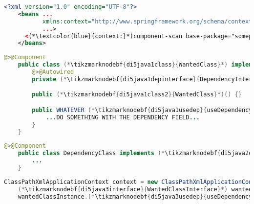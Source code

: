 \example
\begin{lstlisting}[language=XML, title={Configuration XML}]
    <?xml version="1.0" encoding="UTF-8"?>
    <beans ...
           xmlns:context="http://www.springframework.org/schema/context"
           ...>
      <(*\textcolor{blue}{context:}*)component-scan base-package="somepackage.subpackage"/>
    </beans>
\end{lstlisting}
\begin{lstlisting}[language=Java, title={Wanted class with the zero--parameter constructor}]
    @>@Component
    public class (*\tikzmarknodebf{di5java1class}{WantedClass}*) implements (*\tikzmarknodebf{di5java1interface}{WantedClassInterface}*) {
        @>@Autowired
        private (*\tikzmarknodebf{di5java1depinterface}{DependencyInterface}*) dependencyField;

        public (*\tikzmarknodebf{di5java1class2}{WantedClass}*)() {}

        public WHATEVER (*\tikzmarknodebf{di5java1usedep}{useDependency}*)() {
            ...DO SOMETHING WITH THE DEPENDENCY FIELD...
        }
    }
\end{lstlisting}
\begin{lstlisting}[language=Java, title={Dependency class}]
    @>@Component
    public class DependencyClass implements (*\tikzmarknodebf{di5java2depinterface}{DependencyInterface}*) {
        ...
    }
\end{lstlisting}
\begin{lstlisting}[language=Java, title={Usage}]
    ClassPathXmlApplicationContext context = new ClassPathXmlApplicationContext("configurationFile.xml");
    (*\tikzmarknodebf{di5java3interface}{WantedClassInterface}*) wantedClassInstance = context.getBean("(*\tikzmarknodebf{di5java3beanid}{wantedClass}[ForestGreen]*)", (*\tikzmarknodebf{di5java3interface2}{WantedClassInterface}*).class);
    wantedClassInstance.(*\tikzmarknodebf{di5java3usedep}{useDependency}*)();
\end{lstlisting}
\newpage

